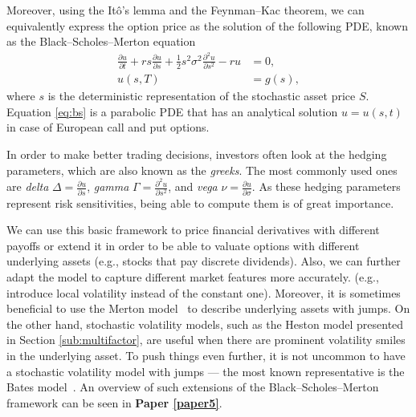 \documentclass{UUThesisTemplate}
\begin{document}
\par
Moreover, using the It\^o's lemma and the Feynman--Kac theorem, we can equivalently express the option price as the solution of the following PDE, known as the Black--Scholes--Merton equation
\begin{align}
\frac{\partial u}{\partial t} + r s \frac{\partial u} {\partial s} + \frac{1}{2} s^2 \sigma^2 \frac{\partial^2 u}{\partial s^2} - r u &= 0, \nonumber \\
u(s,T) &= g(s), \label{eq:bs}
\end{align}
where $s$ is the deterministic representation of the stochastic asset price $S$. Equation \eqref{eq:bs} is a parabolic PDE that has an analytical solution $u=u(s,t)$ in case of European call and put options. %

\par
In order to make better trading decisions, investors often look at the hedging parameters, which are also known as the \emph{greeks}. The most commonly used ones are \emph{delta} $\Delta = \frac{\partial u}{\partial s}$, \emph{gamma} $\Gamma = \frac{\partial^2 u}{\partial s^2}$, and \emph{vega} $\nu = \frac{\partial u}{\partial \sigma}$. As these hedging parameters represent risk sensitivities, being able to compute them is of great importance.

\par
We can use this basic framework to price financial derivatives with different payoffs or extend it in order to be able to valuate options with different underlying assets (e.g., stocks that pay discrete dividends). Also, we can further adapt the model to capture different market features more accurately. (e.g., introduce local volatility instead of the constant one). Moreover, it is sometimes beneficial to use the Merton model~\cite{merton1976option} to describe underlying assets with jumps. On the other hand, stochastic volatility models, such as the Heston model presented in Section \ref{sub:multifactor}, are useful when there are prominent volatility smiles in the underlying asset. To push things even further, it is not uncommon to have a stochastic volatility model with jumps --- the most known representative is the Bates model~\cite{bates1996jumps}. An overview of such extensions of the Black--Scholes--Merton framework can be seen in \textbf{Paper \ref{paper5}}.
\end{document}
